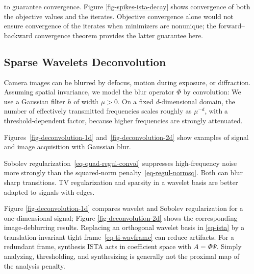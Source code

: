 to guarantee convergence. Figure \ref{fig-spikes-ista-decay} shows convergence of both the objective values and the iterates. Objective convergence alone would not ensure convergence of the iterates when minimizers are nonunique; the forward--backward convergence theorem provides the latter guarantee here.




                                                                
\subsection{Sparse Wavelets Deconvolution}


Camera images can be blurred by defocus, motion during exposure, or diffraction. Assuming spatial invariance, we model the blur operator $\Phi$ by convolution:
We use a Gaussian filter $h$ of width $\mu > 0$. On a fixed $d$-dimensional domain, the number of effectively transmitted frequencies scales roughly as $\mu^{-d}$, with a threshold-dependent factor, because higher frequencies are strongly attenuated.

Figures~\ref{fig-deconvolution-1d} and~\ref{fig-deconvolution-2d} show examples of signal and image acquisition with Gaussian blur.

Sobolev regularization~\eqref{eq-quad-regul-convol} suppresses high-frequency noise more strongly than the squared-norm penalty~\eqref{eq-regul-normsq}. Both can blur sharp transitions. TV regularization and sparsity in a wavelet basis are better adapted to signals with edges.

Figure \ref{fig-deconvolution-1d} compares wavelet and Sobolev regularization for a one-dimensional signal; Figure \ref{fig-deconvolution-2d} shows the corresponding image-deblurring results. Replacing an orthogonal wavelet basis in \eqref{eq-ista} by a translation-invariant tight frame~\eqref{eq-ti-wavframe} can reduce artifacts. For a redundant frame, synthesis ISTA acts in coefficient space with $A=\Phi\Psi$. Simply analyzing, thresholding, and synthesizing is generally not the proximal map of the analysis penalty.


